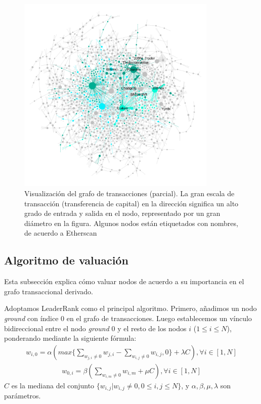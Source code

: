 \begin{figure}[htbp]
	\centering
	\includegraphics[width=0.85\textwidth]{figs/wgc1.png}
	\caption{Visualización del grafo de transacciones (parcial). \small{La gran escala de transacción (transferencia de capital) en la dirección significa un alto grado de entrada y salida en el nodo, representado por un gran diámetro en la figura. Algunos nodos están etiquetados con nombres, de acuerdo a Etherscan\cite{etherscan}}}\label{fig:wgc}
\end{figure}

\subsection{Algoritmo de valuación} \label{subsec:leaderrank}
Esta subsección explica cómo valuar nodos de acuerdo a su importancia en el grafo transaccional derivado.

Adoptamos LeaderRank\cite{Chen2013}\cite{Li2014} como el principal algoritmo. Primero, añadimos un nodo \textit{ground} con índice $0$ en el grafo de transacciones. Luego establecemos un vínculo bidireccional entre el nodo \textit{ground} $0$ y el resto de los nodos $i$ ($1 \leq i \leq N$), ponderando mediante la siguiente fórmula:
\begin{align}\label{formula:weight1}
w_{i,0} = \alpha( max\{ \sum_{w_{j,i} \neq 0} w_{j,i} - \sum_{w_{i,j} \neq 0} w_{i,j} , 0\} + \lambda C ), \forall i \in [1,N]
\end{align}
\begin{align}\label{formula:weight2}
w_{0,i}	= \beta ( \sum_{w_{i,m} \neq 0} w_{i,m} + \mu C), \forall i \in [1,N]
\end{align}
$C$ es la mediana del conjunto $\{w_{i,j} | w_{i,j} \neq 0, 0\leq i,j \leq N\}$, y $\alpha, \beta, \mu, \lambda$ son parámetros.


